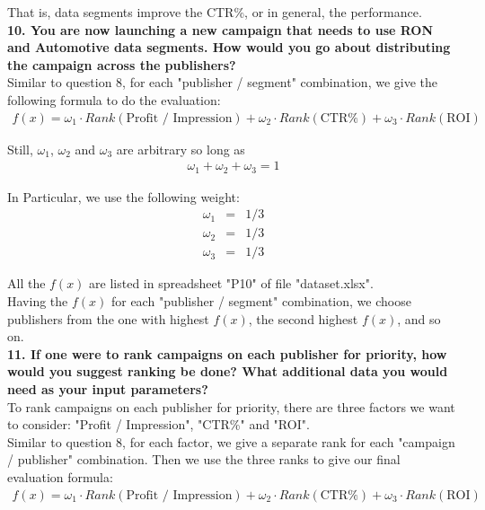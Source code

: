 \documentclass[12pt]{article}
\begin{document}
That is, data segments improve the CTR\%, or in general, the performance. \\

{\bf 10. You are now launching a new campaign that needs to use RON and Automotive data segments. How would you go about distributing the campaign across the publishers?} \\

Similar to question 8, for each "publisher / segment" combination, we give the following formula to do the evaluation:
\begin{eqnarray*}
f(x) = \omega_1 \cdot Rank(\text{Profit / Impression}) + \omega_2 \cdot Rank(\text{CTR\%}) + \omega_3 \cdot Rank(\text {ROI})
\end{eqnarray*}

Still, $\omega_1$, $\omega_2$ and $\omega_3$ are arbitrary so long as
\begin{eqnarray*}
\omega_1 + \omega_2 + \omega_3 = 1
\end{eqnarray*}

In Particular, we use the following weight:
\begin{eqnarray*}
\omega_1 &=& 1/3 \\
\omega_2 &=& 1/3 \\
\omega_3 &=& 1/3
\end{eqnarray*}

All the $f(x)$ are listed in spreadsheet "P10" of file "dataset.xlsx". \\

Having the $f(x)$ for each "publisher / segment" combination, we choose publishers from the one with highest $f(x)$, the second highest $f(x)$, and so on. \\

{\bf 11. If one were to rank campaigns on each publisher for priority, how would you suggest ranking be done? What additional data you would need as your input parameters?} \\

To rank campaigns on each publisher for priority, there are three factors we want to consider: "Profit / Impression", "CTR\%" and "ROI". \\

Similar to question 8, for each factor, we give a separate rank for each "campaign / publisher" combination. Then we use the three ranks to give our final evaluation formula:
\begin{eqnarray*}
f(x) = \omega_1 \cdot Rank(\text{Profit / Impression}) + \omega_2 \cdot Rank(\text{CTR\%}) + \omega_3 \cdot Rank(\text {ROI})
\end{eqnarray*}
\end{document}
